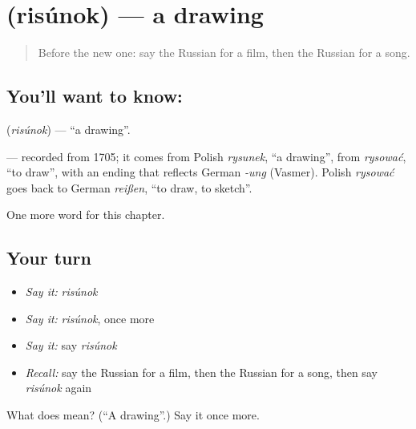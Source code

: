 \section[\texorpdfstring{\ru{рисунок} (risúnok)}{рисунок (risúnok)}]{ (risúnok) — a drawing}

\label{lesson:RU-C113-drawing}



\begin{quote}
Before the new one: say the Russian for a film, then the Russian for a song.
\end{quote}

\subsection*{You'll want to know: }
\textbf{} (\emph{risúnok}) — \textquotedblleft{}a drawing\textquotedblright{}.

\begin{cousinweb}
\textbf{} — recorded from 1705; it comes from Polish \emph{rysunek}, \textquotedblleft{}a drawing\textquotedblright{}, from \emph{rysować}, \textquotedblleft{}to draw\textquotedblright{}, with an ending that reflects German \emph{-ung} (Vasmer). Polish \emph{rysować} goes back to German \emph{reißen}, \textquotedblleft{}to draw, to sketch\textquotedblright{}.
\end{cousinweb}

\begin{grammarlens}[title={What you've built}]
One more word for this chapter.
\end{grammarlens}

\subsection*{Your turn}
\begin{itemize}
\raggedright
  \item \emph{Say it:} \emph{risúnok}
  \item \emph{Say it:} \emph{risúnok}, once more
  \item \emph{Say it:} say \emph{risúnok}
  \item \emph{Recall:} say the Russian for a film, then the Russian for a song, then say \emph{risúnok} again
\end{itemize}

\begin{tcolorbox}[breakable,colback=teal!4,colframe=teal!35!black,title={Before you move on}]
What does  mean? (\textquotedblleft{}A drawing\textquotedblright{}.) Say it once more.
\end{tcolorbox}
